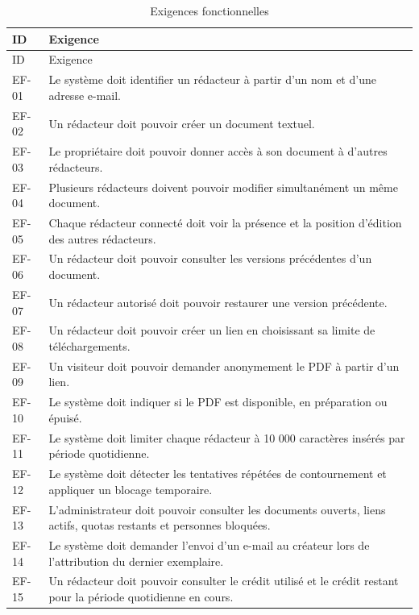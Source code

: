 \begingroup\small\setlength{\tabcolsep}{3pt}\renewcommand{\arraystretch}{1.25}
\begin{longtable}{|P{0.14\textwidth}|P{0.79\textwidth}|}
\caption{Exigences fonctionnelles}\\
\hline
ID & Exigence \\ \hline
\endfirsthead
\hline
ID & Exigence \\ \hline
\endhead
\endfoot

EF-01 & Le système doit identifier un rédacteur à partir d'un nom et d'une adresse e-mail. \\ \hline

EF-02 & Un rédacteur doit pouvoir créer un document textuel. \\ \hline

EF-03 & Le propriétaire doit pouvoir donner accès à son document à d'autres rédacteurs. \\ \hline

EF-04 & Plusieurs rédacteurs doivent pouvoir modifier simultanément un même document. \\ \hline

EF-05 & Chaque rédacteur connecté doit voir la présence et la position d'édition des autres rédacteurs. \\ \hline

EF-06 & Un rédacteur doit pouvoir consulter les versions précédentes d'un document. \\ \hline

EF-07 & Un rédacteur autorisé doit pouvoir restaurer une version précédente. \\ \hline

EF-08 & Un rédacteur doit pouvoir créer un lien en choisissant sa limite de téléchargements. \\ \hline

EF-09 & Un visiteur doit pouvoir demander anonymement le PDF à partir d'un lien. \\ \hline

EF-10 & Le système doit indiquer si le PDF est disponible, en préparation ou épuisé. \\ \hline

EF-11 & Le système doit limiter chaque rédacteur à 10 000 caractères insérés par période quotidienne. \\ \hline

EF-12 & Le système doit détecter les tentatives répétées de contournement et appliquer un blocage temporaire. \\ \hline

EF-13 & L'administrateur doit pouvoir consulter les documents ouverts, liens actifs, quotas restants et personnes bloquées. \\ \hline

EF-14 & Le système doit demander l'envoi d'un e-mail au créateur lors de l'attribution du dernier exemplaire. \\ \hline

EF-15 & Un rédacteur doit pouvoir consulter le crédit utilisé et le crédit restant pour la période quotidienne en cours. \\ \hline

\end{longtable}\endgroup

